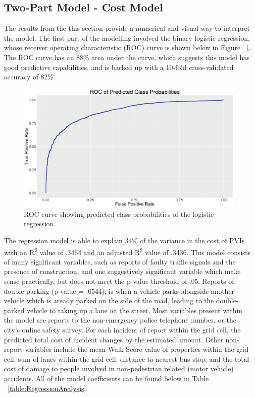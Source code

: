 \documentclass{llncs}
\begin{document}
\subsection{Two-Part Model - Cost Model}

The results from the this section provide a numerical and visual way to interpret the model. The first part of the modelling involved the binary logistic regression, whose receiver operating characteristic (ROC) curve is shown below in Figure ~\ref{figure:LogisticROC}. The ROC curve has an 88\% area under the curve, which suggests this model has good predictive capabilities, and is backed up with a 10-fold cross-validated accuracy of 82\%.

\FloatBarrier
\begin{figure}
\includegraphics[width=\textwidth, height=\textheight, keepaspectratio]{000LogisticModelROC.png}
\caption{ROC curve showing predicted class probabilities of the logistic regression.}
\label{figure:LogisticROC}
\end{figure}
\FloatBarrier

The regression model is able to explain 34\% of the variance in the cost of PVIs with an R\textsuperscript{2} value of .3464 and an adjusted R\textsuperscript{2} value of .3436. This model consists of many significant variables, such as reports of faulty traffic signals and  the presence of construction, and one suggestively significant variable which make sense practically, but does not meet the p-value threshold of .05. Reports of double parking (p-value = .0544), is when a vehicle parks alongside another vehicle which is aready parked on the side of the road, leading to the double-parked vehicle to taking up a lane on the street. Most variables present within the model are reports to the non-emergency police telephone number, or the city’s online safety survey. For each incident of report within the grid cell, the predicted total cost of incident changes by the estimated amount. Other non-report variables include the mean Walk Score value of properties within the grid cell, sum of lanes within the grid cell, distance to nearest bus stop, and the total cost of damage to people involved in non-pedestrian related (motor vehicle) accidents. All of the model coefficients can be found below in Table ~\ref{table:RegressionAnalysis}.
\end{document}
